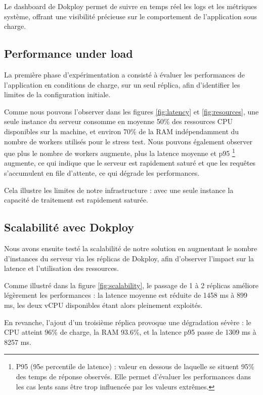 \documentclass{rapportClass} %
\begin{document}
\smallskip
Le dashboard de Dokploy permet de suivre en temps réel les logs et les métriques système, 
offrant une visibilité précieuse sur le comportement de l'application sous charge.


\subsection{Performance under load}
\label{sec:results-perf}
La première phase d'expérimentation a consisté à évaluer les performances de l'application en conditions de charge,
sur un seul réplica, afin d'identifier les limites de la configuration initiale.

Comme nous pouvons l'observer dans les figures \ref{fig:latency} et \ref{fig:resources}, une seule instance du serveur 
consomme en moyenne 50\% des ressources CPU disponibles sur la machine, et environ 70\% de la RAM indépendamment 
du nombre de workers utilisés pour le stress test.
Nous pouvons également observer que plus le nombre de workers augmente, plus la latence moyenne et p95
\footnote{P95 (95e percentile de latence) : valeur en dessous de laquelle se situent 95\% des temps de réponse observés.
Elle permet d'évaluer les performances dans les cas lents sans être trop influencée par les valeurs extrêmes.} 
augmente, ce qui indique que le serveur est rapidement saturé et que les requêtes s'accumulent en file d'attente, 
ce qui dégrade les performances.

\smallskip
Cela illustre les limites de notre infrastructure : avec une seule
instance la capacité de traitement est rapidement saturée.


\subsection{Scalabilité avec Dokploy}
\label{sec:results-scaling}
Nous avons ensuite testé la scalabilité de notre solution en augmentant le nombre d'instances du serveur via les réplicas de Dokploy,
afin d'observer l'impact sur la latence et l'utilisation des ressources.

Comme illustré dans la figure \ref{fig:scalability}, le passage de 1 à 2 réplicas améliore légèrement les performances : 
la latence moyenne est réduite de 1458 ms à 899 ms, les deux vCPU disponibles étant alors pleinement exploités.

En revanche, l'ajout d'un troisième réplica provoque une dégradation sévère : le CPU atteint 96\% de charge,
la RAM 93.6\%, et la latence p95 passe de 1309 ms à 8257 ms.
\end{document}
